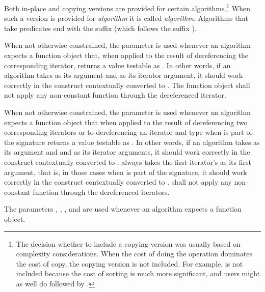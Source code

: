 \pnum
Both in-place and copying versions are provided for certain
algorithms.\footnote{The decision whether to include a copying version was
usually based on complexity considerations. When the cost of doing the operation
dominates the cost of copy, the copying version is not included. For example,
 is not included because the cost of sorting is much more
significant, and users might as well do  followed by .}
When such a version is provided for \textit{algorithm} it is called
\textit{algorithm}. Algorithms that take predicates end with the
suffix  (which follows the suffix ).

\pnum
When not otherwise constrained, the
parameter is used whenever an algorithm expects a function object
that, when applied to the result
of dereferencing the corresponding iterator, returns a value testable as
.
In other words, if an algorithm
takes
as its argument and 
as its iterator argument, it should work correctly in the
construct
 contextually converted to .
The function object
shall not apply any non-constant
function through the dereferenced iterator.

\pnum
When not otherwise constrained, the
parameter is used whenever an algorithm expects a function object that when applied to
the result of dereferencing two corresponding iterators or to dereferencing an
iterator and type
when
is part of the signature returns a value testable as
.
In other words, if an algorithm takes
as its argument and  and  as
its iterator arguments, it should work correctly in
the construct
 contextually converted to .
always takes the first
iterator's 
as its first argument, that is, in those cases when
is part of the signature, it should work
correctly in the
construct  contextually converted to .
 shall not
apply any non-constant function through the dereferenced iterators.

\pnum
The parameters
,
,
,
and 
are used
whenever an algorithm expects a function object.

